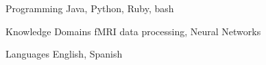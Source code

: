 

\begin{cvskills}

  \cvskill
    {Programming} %
    {Java, Python, Ruby, bash} %

  \cvskill
    {Knowledge Domains} %
    {fMRI data processing, Neural Networks} %

  \cvskill
    {Languages} %
    {English, Spanish} %

\end{cvskills}
